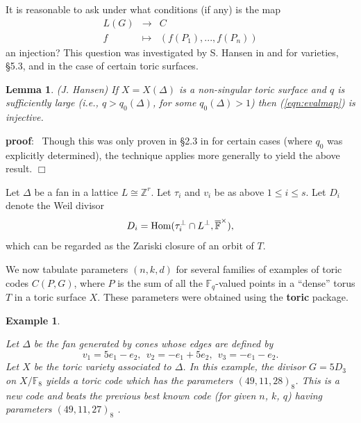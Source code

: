 \documentclass[12pt]{article}
\newtheorem{lemma}[theorem]{Lemma}
\newtheorem{example}[theorem]{Example}
\def\pf{{\bf proof}:\ }
\def\qed{$\Box$}
\def\fff{\mathbb{F}}
\def\zzz{\mathbb{Z}}
\begin{document}
It is reasonable to ask under what conditions (if any) is the map
\begin{equation}
\label{eqn:evalmap}
\begin{array}{ccc}
L(G) & \rightarrow &C\\
f & \longmapsto & (f(P_1),...,f(P_n))
\end{array}
\end{equation}
an injection? This question was investigated by S. Hansen in \cite{Han3}
and \cite{Han1} for varieties, \S 5.3, and \cite{H3} 
in the case of certain toric surfaces.


\begin{lemma} (J. Hansen)
\label{lemma:eval}
If $X=X(\Delta)$ is a non-singular toric surface and $q$ is 
sufficiently large (i.e., $q>q_0(\Delta)$, for some $q_0(\Delta)>1$)
then (\ref{eqn:evalmap}) is injective.
\end{lemma}

\pf
Though this was only proven in \S 2.3 in \cite{H3} for certain cases
(where $q_0$ was explicitly determined),
the technique applies more generally to yield the
above result.
\qed

Let $\Delta$ be a fan in a lattice $L\cong \zzz^r$. 
Let $\tau_i$ and $v_i$ be as above $1\leq i\leq s$.
Let $D_i$ denote the Weil divisor 
\begin{equation}
\label{eqn:divisor}
D_i={\rm Hom}(\tau_i^\perp\cap L^\perp,\overline{\fff}^\times),
\end{equation}
which can be regarded as the Zariski closure of an orbit of $T$. 

We now tabulate parameters $(n,k,d)$ for
several families of examples of toric codes
$C(P,G)$, where $P$ is the sum of all the
$\fff_q$-valued points in a ``dense'' torus $T$ in a toric surface $X$.
These parameters were obtained using the {\bf toric} package. 

\begin{example}
\label{example:fan7}

Let $\Delta$ be the fan generated by cones
whose edges are defined by
\[
v_1=5e_1-e_2,\ \ v_2=-e_1+5e_2,\ \ v_3=-e_1-e_2.
\]
Let $X$ be the toric variety associated to $\Delta$.
In this example, the divisor $G=5D_3$ on $X/\fff_8$ yields a 
toric code which has the parameters $(49,11,28)_8$. 
This is a new code and beats the previous best known code
(for given $n$, $k$, $q$)
having parameters $(49,11,27)_8$ \cite{B}.


\end{example}
\end{document}
